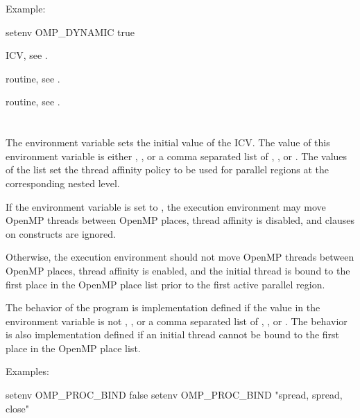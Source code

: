 Example:
\begin{ompEnv}
setenv OMP_DYNAMIC true
\end{ompEnv}

\begin{crossrefs}
\item {} ICV, see .

\item {} routine, see .

\item {} routine, see .
\end{crossrefs}



\section{}
\label{sec:OMP_PROC_BIND}
The  environment variable sets the initial value of
the  ICV. The value of this environment variable is either
, , or a comma separated list of ,
, or . The values of the list set the thread
affinity policy to be used for parallel regions at the corresponding nested level.

If the environment variable is set to , the execution
environment may move OpenMP threads between OpenMP places, thread
affinity is disabled, and  clauses on 
constructs are ignored.

Otherwise, the execution environment should not move OpenMP threads between
OpenMP places, thread affinity is enabled, and the initial thread is bound
to the first place in the OpenMP place list prior to the first active
parallel region.

The behavior of the program is implementation defined if the value in the
 environment variable is not , ,
or a comma separated list of , , or .
The behavior is also implementation defined if an initial thread cannot be
bound to the first place in the OpenMP place list.

Examples:
\begin{ompEnv}
setenv OMP_PROC_BIND false
setenv OMP_PROC_BIND "spread, spread, close"
\end{ompEnv}

